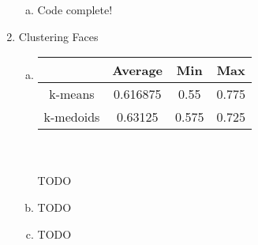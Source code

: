 \documentclass[11pt]{article}
\begin{document}
\begin{enumerate}[1]
\begin{enumerate}[(a)]
\item Code complete!
\end{enumerate}
\item Clustering Faces
\begin{enumerate}[(a)]
\item \begin{tabular}{| c | c | c | c |}
  \hline		
   & Average & Min & Max \\
  \hline
  k-means & 0.616875 & 0.55 & 0.775 \\
  k-medoids & 0.63125 & 0.575 & 0.725   \\
  \hline
\end{tabular}\\ \\
TODO
\item TODO
\item TODO
\end{enumerate}
\end{enumerate}
\end{document}
